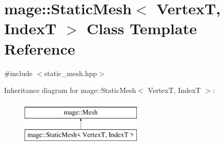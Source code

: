 \hypertarget{classmage_1_1_static_mesh}{}\section{mage\+:\+:Static\+Mesh$<$ VertexT, IndexT $>$ Class Template Reference}
\label{classmage_1_1_static_mesh}


{\ttfamily \#include $<$static\+\_\+mesh.\+hpp$>$}

Inheritance diagram for mage\+:\+:Static\+Mesh$<$ VertexT, IndexT $>$\+:\begin{figure}[H]
\begin{center}
\leavevmode
\includegraphics[height=2.000000cm]{classmage_1_1_static_mesh}
\end{center}
\end{figure}
